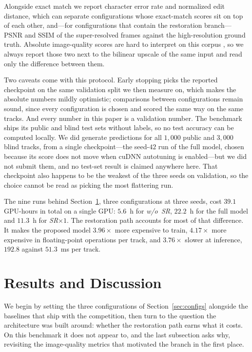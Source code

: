 \documentclass[runningheads]{llncs}
\begin{document}
Alongside exact match we report character error rate and normalized edit distance, which can separate configurations whose exact-match scores sit on top of each other, and---for configurations that contain the restoration branch---PSNR and SSIM of the super-resolved frames against the high-resolution ground truth. Absolute image-quality scores are hard to interpret on this corpus \cite{nascimento2025toward}, so we always report those two next to the bilinear upscale of the same input and read only the difference between them.

Two caveats come with this protocol. Early stopping picks the reported checkpoint on the same validation split we then measure on, which makes the absolute numbers mildly optimistic; comparisons between configurations remain sound, since every configuration is chosen and scored the same way on the same tracks. And every number in this paper is a validation number. The benchmark ships its public and blind test sets without labels, so no test accuracy can be computed locally. We did generate predictions for all $1{,}000$ public and $3{,}000$ blind tracks, from a single checkpoint---the seed-$42$ run of the full model, chosen because its score does not move when cuDNN autotuning is enabled---but we did not submit them, and no test-set result is claimed anywhere here. That checkpoint also happens to be the weakest of the three seeds on validation, so the choice cannot be read as picking the most flattering run.

The nine runs behind Section~\ref{sec:results}, three configurations at three seeds, cost $39.1$ GPU-hours in total on a single GPU: $5.6$~h for \emph{w/o~SR}, $22.2$~h for the full model and $11.3$~h for \emph{SR$\times 1$}. The restoration path accounts for most of that difference. It makes the proposed model $3.96\times$ more expensive to train, $4.17\times$ more expensive in floating-point operations per track, and $3.76\times$ slower at inference, $192.8$ against $51.3$~ms per track.


\section{Results and Discussion}
\label{sec:results}

We begin by setting the three configurations of Section~\ref{sec:configs} alongside the baselines that ship with the competition, then turn to the question the architecture was built around: whether the restoration path earns what it costs. On this benchmark it does not appear to, and the last subsection asks why, revisiting the image-quality metrics that motivated the branch in the first place.
\end{document}
